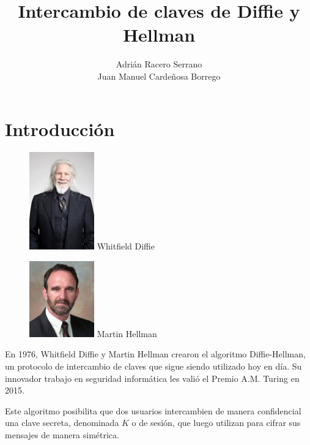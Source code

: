 \documentclass[11pt]{article}
\title{\textbf{\huge Intercambio de claves de Diffie y Hellman}}
\author{Adrián Racero Serrano\\Juan Manuel Cardeñosa Borrego}
\date{}
\begin{document}
\maketitle

\thispagestyle{empty}

\newpage

\setcounter{page}{1}
\tableofcontents

\newpage


\section{Introducción}

\begin{figure} %
    \centering
    \includegraphics[width=0.25\textwidth]{img/Diffie.jpg}
    Whitfield Diffie
    
    \includegraphics[width=0.25\textwidth]{img/Hellman.jpg}
    Martin Hellman
\end{figure}

En 1976, Whitfield Diffie y Martin Hellman crearon el algoritmo Diffie-Hellman, un protocolo de intercambio de claves que sigue siendo utilizado hoy en día. Su innovador trabajo en seguridad informática les valió el Premio A.M. Turing en 2015.

Este algoritmo posibilita que dos usuarios intercambien de manera confidencial una clave secreta, denominada $K$ o de sesión, que luego utilizan para cifrar sus mensajes de manera simétrica.
\end{document}
